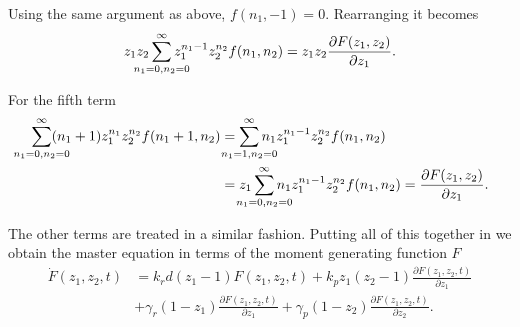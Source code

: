 Using the same argument as above, $f(n_1,-1) = 0$. Rearranging it becomes
\begin{equation*}
  z_1 z_2 \sum_{\mathclap{n_1=0,n_2=0}}^\infty z_1^{n_1-1}z_2^{n_2}f(n_1,n_2) = z_1 z_2 \frac{\partial F(z_1,z_2)}{\partial z_1}.
\end{equation*}

For the fifth term
\begin{equation*}
  \begin{split}
    \sum_{\mathclap{n_1=0,n_2=0}}^\infty (n_1+1)z_1^{n_1}z_2^{n_2}f(n_1+1,n_2) &= \sum_{\mathclap{n_1=1,n_2=0}}^\infty n_1z_1^{n_1-1}z_2^{n_2}f(n_1,n_2)\\ 
    &= z_1 \sum_{\mathclap{n_1=0,n_2=0}}^\infty n_1z_1^{n_1-1}z_2^{n_2}f(n_1,n_2) = \frac{\partial F(z_1,z_2)}{\partial z_1}.
  \end{split}
\end{equation*}

The other terms are treated in a similar fashion. Putting all of this together in we obtain the master equation in terms of the moment generating function $F$
\begin{equation}
  \label{eq:masterF}
  \begin{split}
    \dot{F}(z_1,z_2,t) &= k_rd(z_1-1)F(z_1,z_2,t) + k_pz_1(z_2-1)\frac{\partial F(z_1,z_2,t)}{\partial z_1} \\
    &+ \gamma_r(1-z_1)\frac{\partial F(z_1,z_2,t)}{\partial z_1} + \gamma_p(1-z_2)\frac{\partial F(z_1,z_2,t)}{\partial z_2}.
  \end{split}
\end{equation}

